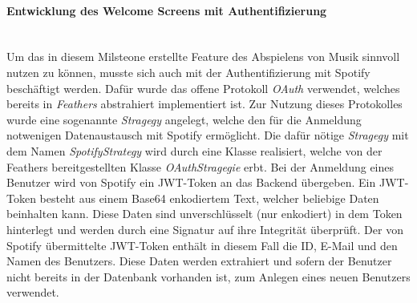 \documentclass[10pt, a4paper]{article}
\begin{document}
\paragraph*{Entwicklung des Welcome Screens mit Authentifizierung} $~$ \\
Um das in diesem Milsteone erstellte Feature des Abspielens von Musik sinnvoll nutzen zu können, musste sich auch mit der Authentifizierung mit Spotify beschäftigt
werden. Dafür wurde das offene Protokoll \textit{OAuth} verwendet, welches bereits in \textit{Feathers} abstrahiert implementiert ist. Zur Nutzung dieses
Protokolles wurde eine sogenannte \textit{Stragegy} angelegt, welche den für die Anmeldung notwenigen Datenaustausch mit Spotify ermöglicht.
Die dafür nötige \textit{Stragegy} mit dem Namen \textit{SpotifyStrategy} wird durch eine Klasse realisiert, welche von der Feathers bereitgestellten Klasse
\textit{OAuthStragegie} erbt. Bei der Anmeldung eines Benutzer wird von Spotify ein JWT-Token an das Backend übergeben. Ein JWT-Token besteht aus einem Base64
enkodiertem Text, welcher beliebige Daten beinhalten kann. Diese Daten sind unverschlüsselt (nur enkodiert) in dem Token hinterlegt und werden
durch eine Signatur auf ihre Integrität überprüft. Der von Spotify übermittelte JWT-Token enthält in diesem Fall die ID, E-Mail und den Namen des
Benutzers. Diese Daten werden extrahiert und sofern der Benutzer nicht bereits in der Datenbank vorhanden ist, zum Anlegen eines neuen Benutzers verwendet.
\end{document}

